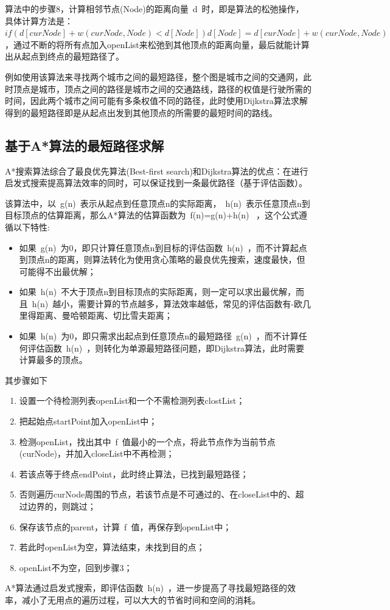 \par 算法中的步骤8，计算相邻节点(Node)的距离向量~d~时，即是算法的松弛操作，具体计算方法是：$if (d[curNode] + w(curNode, Node) < d[Node]) d[Node] = d[curNode] + w(curNode, Node)$，通过不断的将所有点加入openList来松弛到其他顶点的距离向量，最后就能计算出从起点到终点的最短路径了。
\par 例如使用该算法来寻找两个城市之间的最短路径，整个图是城市之间的交通网，此时顶点是城市，顶点之间的路径是城市之间的交通路线，路径的权值是行驶所需的时间，因此两个城市之间可能有多条权值不同的路径，此时使用Dijkstra算法求解得到的最短路径即是从起点出发到其他顶点的所需要的最短时间的路线。

\subsection{基于A*算法的最短路径求解}
\label{section:A*algorithm_exp}
\par A*搜索算法综合了最良优先算法(Best-first search)和Dijkstra算法的优点：在进行启发式搜索提高算法效率的同时，可以保证找到一条最优路径（基于评估函数）\cite{r4}。
\par 该算法中，以~g(n)~表示从起点到任意顶点n的实际距离，~h(n)~表示任意顶点n到目标顶点的估算距离，那么A*算法的估算函数为~f(n)=g(n)+h(n)~ \cite{r6}，这个公式遵循以下特性:
\begin{itemize}
    \item 如果~g(n)~为0，即只计算任意顶点n到目标的评估函数~h(n)~，而不计算起点到顶点n的距离，则算法转化为使用贪心策略的最良优先搜索，速度最快，但可能得不出最优解；
    \item 如果~h(n)~不大于顶点n到目标顶点的实际距离，则一定可以求出最优解，而且~h(n)~越小，需要计算的节点越多，算法效率越低，常见的评估函数有-欧几里得距离、曼哈顿距离、切比雪夫距离；
    \item 如果~h(n)~为0，即只需求出起点到任意顶点n的最短路径~g(n)~，而不计算任何评估函数~h(n)~，则转化为单源最短路径问题，即Dijkstra算法，此时需要计算最多的顶点。
\end{itemize}
\par 其步骤如下
\begin{enumerate}
    \item 设置一个待检测列表openList和一个不需检测列表clostList；
    \item 把起始点startPoint加入openList中；
    \item 检测openList，找出其中~f~值最小的一个点，将此节点作为当前节点(curNode)，并加入closeList中不再检测；
    \item 若该点等于终点endPoint，此时终止算法，已找到最短路径；
    \item 否则遍历curNode周围的节点，若该节点是不可通过的、在closeList中的、超过边界的，则跳过；
    \item 保存该节点的parent，计算~f~值，再保存到openList中；
    \item 若此时openList为空，算法结束，未找到目的点；
    \item openList不为空，回到步骤3；
\end{enumerate}
\par A*算法通过启发式搜索，即评估函数~h(n)~，进一步提高了寻找最短路径的效率，减小了无用点的遍历过程，可以大大的节省时间和空间的消耗。

